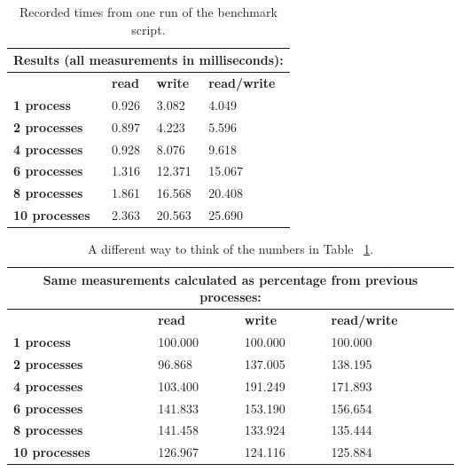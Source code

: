 \documentclass[final,a4paper]{article}
\begin{document}
\begin{table}[H]
  \centering
  \begin{tabular}{|l|l|l|l|}
    \hline
    \multicolumn{4}{|c|}{\bf Results (all measurements in milliseconds):}\\
    \hline
    \hline
    & {\bf read } & { \bf write } & { \bf read/write } \\
    \hline
    { \bf 1 process }    & 0.926 &  3.082 &  4.049 \\
    \hline
    { \bf 2 processes }  & 0.897 &  4.223 &  5.596 \\
    \hline
    { \bf 4 processes }  & 0.928 &  8.076 &  9.618 \\
    \hline
    { \bf 6 processes }  & 1.316 & 12.371 & 15.067 \\
    \hline
    { \bf 8 processes }  & 1.861 & 16.568 & 20.408 \\
    \hline
    { \bf 10 processes } & 2.363 & 20.563 & 25.690 \\
    \hline
  \end{tabular}
  \caption{Recorded times from one run of the benchmark script.}
  \label{table1}
\end{table}

\begin{table}[H]
  \centering
  \begin{tabular}{|l|l|l|l|}
    \hline
    \multicolumn{4}{|c|}{\bf Same measurements calculated as percentage from
      previous processes:}\\
    \hline
    \hline
    & {\bf read } & { \bf write } & { \bf read/write } \\
    \hline
    { \bf 1 process }    & 100.000 & 100.000 & 100.000 \\
    \hline
    { \bf 2 processes }  &  96.868 & 137.005 & 138.195 \\
    \hline
    { \bf 4 processes }  & 103.400 & 191.249 & 171.893 \\
    \hline
    { \bf 6 processes }  & 141.833 & 153.190 & 156.654 \\
    \hline
    { \bf 8 processes }  & 141.458 & 133.924 & 135.444 \\
    \hline
    { \bf 10 processes } & 126.967 & 124.116 & 125.884 \\
    \hline
  \end{tabular}
  \caption{A different way to think of the numbers in Table ~\ref{table1}.}
  \label{table2}
\end{table}
\end{document}
